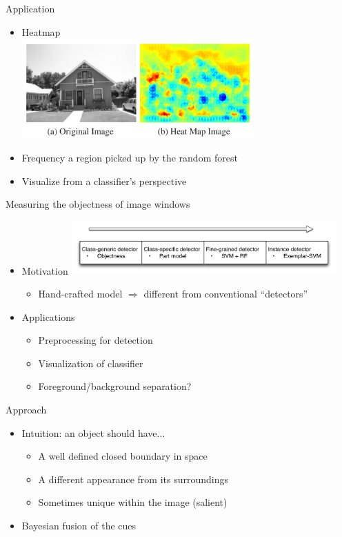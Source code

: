 \documentclass[12pt]{beamer}
\begin{document}
\begin{frame}{Application}
    \begin{itemize}
        \item Heatmap \\
        \medskip
        { \includegraphics[width=0.7\textwidth]{fig1.png} }
        \item Frequency a region picked up by the random forest
        \item Visualize from a classifier's perspective
    \end{itemize}
\end{frame}
\begin{frame}{Measuring the objectness of image windows}
    \begin{itemize}
        \item Motivation
        \medskip
        { \includegraphics[width=0.8\textwidth]{motivation.png} } 
        \begin{itemize}
            \item Hand-crafted model $\Rightarrow$ different from conventional ``detectors''
        \end{itemize}
        \item Applications
        \begin{itemize}
            \item Preprocessing for detection
            \item Visualization of classifier
            \item Foreground/background separation?
        \end{itemize}
    \end{itemize}
\end{frame}

\begin{frame}{Approach}
    \begin{itemize}
        \item Intuition: an object should have...
        \begin{itemize}
            \item A well defined closed boundary in space
            \item A different appearance from its surroundings
            \item Sometimes unique within the image (salient)
        \end{itemize}
        \item Bayesian fusion of the cues
    \end{itemize}
\end{frame}
\end{document}
